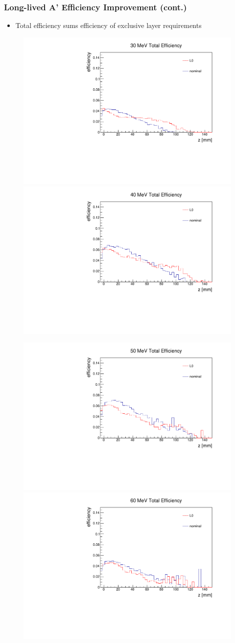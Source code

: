 \documentclass{beamer}
\begin{document}
\begin{frame}
\frametitle{Long-lived A' Efficiency Improvement (cont.)}
\begin{itemize}
\item Total efficiency sums efficiency of exclusive layer requirements
\end{itemize}
\begin{figure}
\includegraphics[width=0.38\linewidth]{figs/stat_eff_30loose_histo.pdf}
\includegraphics[width=0.38\linewidth]{figs/stat_eff_40loose_histo.pdf}
\end{figure}
\begin{figure}
\includegraphics[width=0.38\linewidth]{figs/stat_eff_50loose_histo.pdf}
\includegraphics[width=0.38\linewidth]{figs/stat_eff_60loose_histo.pdf}
\end{figure}

\end{frame}

\end{document}
